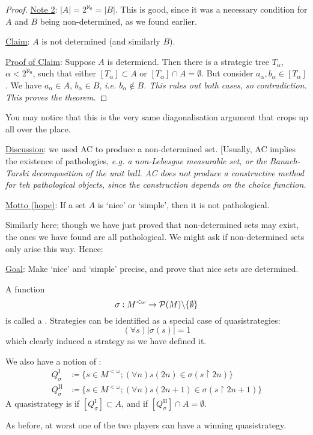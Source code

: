 \documentclass[]{article}
\newcommand{\I}{\textrm{I}}
\newcommand{\II}{\textrm{II}}
\newcommand{\lom}{{<\omega}}
\begin{document}
\begin{proof}
    \underline{Note 2}: $|A| = 2^{\aleph_0} = |B|$. This is good, since it was a necessary condition for $A$ and $B$ being non-determined, as we found earlier.

    \underline{Claim}: $A$ is not determined (and similarly $B$).

    \underline{Proof of Claim}: Suppose $A$ is determiend. Then there is a strategic tree $T_\alpha$, $\alpha <2^{\aleph_0}$, such that either $[T_\alpha] \subset A$ or $[T_\alpha]\cap A = \emptyset$. But consider $a_\alpha,b_\alpha \in [T_\alpha]$. We have $a_\alpha \in A$, $b_\alpha \in B$, \it{i.e.} $b_\alpha\not\in B$. This rules out both cases, so contradiction. This proves the theorem.
\end{proof}

You may notice that this is the very same diagonalisation argument that crops up all over the place.

\underline{Discussion}: we used AC to produce a non-determined set. [Usually, AC implies the existence of pathologies, \it{e.g.} a non-Lebesgue measurable set, or the Banach-Tarski decomposition of the unit ball. AC does not produce a constructive method for teh pathological objects, since the construction depends on the choice function.

\underline{Motto (hope)}: If a set $A$ is `nice' or `simple', then it is not pathological.

Similarly here; though we have just proved that non-determined sets may exist, the ones we have found are all pathological. We might ask if non-determined sets only arise this way. Hence:

\underline{Goal}: Make `nice' and `simple' precise, and prove that nice sets are determined.


\begin{defin*}[Quasistrategy]
    A function $$\sigma:M^{\lom}\ra \mathcal{P}(M)\backslash \{\emptyset\}$$ is called a . Strategies can be identified as a special case of quasistrategies: $$(\forall s)|\sigma(s)| = 1$$ which clearly induced a strategy as we have defined it.

    We also have a notion of :
    \begin{align*}
        Q_\sigma^\I &\coloneqq \{s\in M^\lom; (\forall n) s(2n)\in \sigma(s\restriction 2n)\}\\
        Q_\sigma^\II &\coloneqq \{s\in M^{\lom}; (\forall n) s(2n+1)\in \sigma(s\restriction 2n+1)\}
    \end{align*}
    A quasistrategy is  if $[Q_\sigma^\I]\subset A$, and  if $[Q_\sigma^\II]\cap A = \emptyset$.

    As before, at worst one of the two players can have a winning quasistrategy.
\end{defin*}
\end{document}
